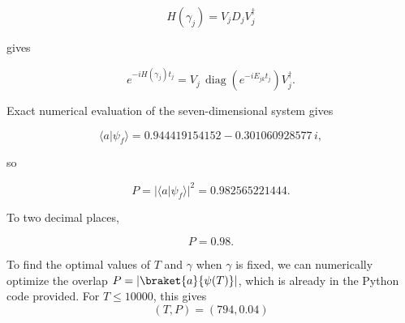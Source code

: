 \[
H(\gamma_j)=V_jD_jV_j^\dagger
\]

gives

\[
e^{-iH(\gamma_j)t_j} = V_j\,\operatorname{diag} \left(e^{-iE_{jk}t_j}\right)V_j^\dagger.
\]

Exact numerical evaluation of the seven-dimensional system gives

\[
\langle a|\psi_f\rangle = 0.944419154152-0.301060928577\,i,
\]

so

\[
P = |\langle a|\psi_f\rangle|^2 = 0.982565221444.
\]

To two decimal places,

\[
P=0.98.
\]

{\color{blue} To find the optimal values of $T$ and $\gamma$ when $\gamma$ is fixed, we can numerically optimize the overlap $P = |\braket{a}{\psi(T)}|$, which is already in the Python code provided. For $T\le 10000$, this gives
\[
(T, P) = (794, 0.04)
\]
}
